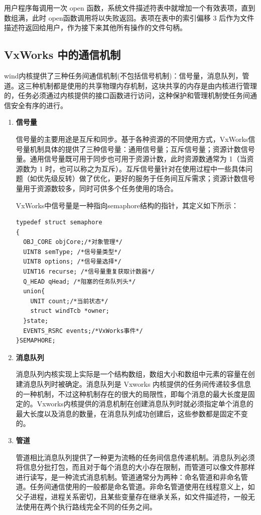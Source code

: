 用户程序每调用一次 open 函数，系统文件描述符表中就增加一个有效表项，直到数组满，此时 open函数调用将以失败返回。表项在表中的索引偏移 3 后作为文件描述符返回给用户，作为接下来其他所有操作的文件句柄。	
	
\subsection{VxWorks 中的通信机制}
	
	wind内核提供了三种任务间通信机制(不包括信号机制)：信号量，消息队列，管道。这三种机制都是使用的共享物理内存机制，这块共享的内存是由内核进行管理的，任务必须通过内核提供的接口函数进行访问，这种保护和管理机制使任务间通信安全有序的进行。

\begin{enumerate}
	\item \textbf{信号量}
	
	信号量的主要用途是互斥和同步。基于各种资源的不同使用方式，VxWorks信号量机制具体的提供了三种信号量：通用信号量；互斥信号量；资源计数信号量。通用信号量既可用于同步也可用于资源计数，此时资源数通常为 1（当资源数为 1 时，也可以称之为互斥）。互斥信号量针对在使用过程中一些具体问题（如优先级反转）做了优化，更好的服务于任务间互斥需求；资源计数信号量用于资源数较多，同时可供多个任务使用的场合。
	
	VxWorks中信号量是一种指向semaphore结构的指针，其定义如下所示：
\lstset{language=C}
\begin{lstlisting}
typedef struct semaphore
{
  OBJ_CORE objCore;/*对象管理*/
  UINT8 semType; /*信号量类型*/
  UINT8 options; /*信号量选择*/
  UINT16 recurse; /*信号量重复获取计数器*/
  Q_HEAD qHead; /*阻塞的任务队列头*/
  union{
	UNIT count;/*当前状态*/
	struct windTcb *owner;  
  }state;
  EVENTS_RSRC events;/*VxWorks事件*/
}SEMAPHORE;
\end{lstlisting}
	
	\item \textbf{消息队列}
	
	消息队列内核实现上实际是一个结构数组，数组大小和数组中元素的容量在创建消息队列时被确定。消息队列是 Vxworks 内核提供的任务间传递较多信息的一种机制，不过这种机制存在的很大的局限性，即每个消息的最大长度是固定的。Vxworks内核提供的消息机制在创建消息队列时就必须指定单个消息的最大长度以及消息的数量，在消息队列成功创建后，这些参数都是固定不变的。
	
	\item \textbf{管道}
	
	管道相比消息队列提供了一种更为流畅的任务间信息传递机制。消息队列必须将信息分批打包，而且对于每个消息的大小存在限制，而管道可以像文件那样进行读写，是一种流式消息机制。管道通常分为两种：命名管道和非命名管道。任务间通信使用的一般都是命名管道。非命名管道使用在线程意义上，如父子进程，进程关系密切，且某些变量存在继承关系，如文件描述符，一般无法使用在两个执行路线完全不同的任务之间。
\end{enumerate}\\		
